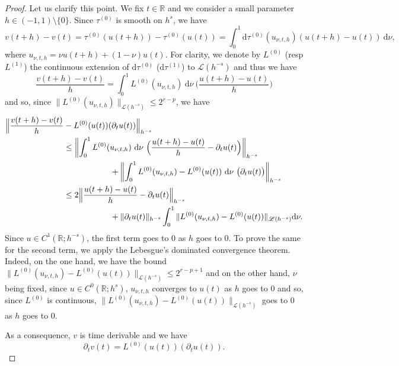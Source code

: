 \begin{proof}
Let us clarify this point. We fix $t\in \mathbb{R}$ and we consider a small parameter $h\in (-1,1)\setminus \{0\}$.
Since $\tau^{(0)}$ is smooth on $h^s$, we have\vspace*{-3pt}
\[
v(t+h)-v(t) = \tau^{(0)}(u(t+h)) - \tau^{(0)}(u(t)) = \int_0^1 \mathrm{d}\tau^{(0)}(u_{\nu,t,h})(u(t+h) - u(t)) \ \mathrm{d}\nu,
\]
where $u_{\nu,t,h} = \nu u(t+h) +(1-\nu) u(t)$. For clarity, we denote by $L^{(0)}$ (resp $L^{(1)}$) the continuous extension of $\mathrm{d}\tau^{(0)}$ (\resp $\mathrm{d}\tau^{(1)}$) to $\mathscr{L}(h^{-s})$ and thus we have\vspace*{-3pt}
\[
\frac{v(t+h)-v(t)}h = \int_0^1 L^{(0)}(u_{\nu,t,h}) \ \mathrm{d}\nu \ \Big(\frac{u(t+h) - u(t)}{h}\Big)
\]
and so, since $ \| L^{(0)}(u_{\nu,t,h}) \|_{\mathscr{L}(h^{-s})}\leq 2^{r-p}$, we have\vspace*{-3pt}
\begin{equation*}
\begin{split}
\Bigl\| \frac{v(t+h)-v(t)}h &- L^{(0)}(u(t))(\partial_t u(t)) \Bigl\|_{h^{-s}} \\
&\leq \biggl\| \int_0^1 L^{(0)}(u_{\nu,t,h}) \ \mathrm{d}\nu \ \Big(\frac{u(t+h) - u(t)}{h} -\partial_t u(t)\Big) \biggl\|_{h^{-s}} \\
&\hspace*{2cm}+ \biggl\| \int_0^1 L^{(0)}(u_{\nu,t,h}) - L^{(0)}(u(t)) \ \mathrm{d}\nu \ \big(\partial_t u(t)\big) \biggl\|_{h^{-s}} \\
&\leq 2 \Big\| \frac{u(t+h) - u(t)}{h} -\partial_t u(t)\Big \|_{h^{-s}} \\ &\hspace*{2cm}+ \| \partial_t u(t) \|_{h^{-s}} \int_0^1 \| L^{(0)}(u_{\nu,t,h}) - L^{(0)}(u(t)) \|_{\mathscr{L}(h^{-s})} \mathrm{d}\nu.
\end{split}
\end{equation*}
Since $u\in C^1(\mathbb{R};h^{-s})$, the first term goes to $0$ as $h$ goes to $0$. To prove the same for the second term, we apply the Lebesgue's dominated convergence theorem. Indeed, on the one hand, we have the bound $ \| L^{(0)}(u_{\nu,t,h}) - L^{(0)}(u(t)) \|_{\mathscr{L}(h^{-s})} \leq 2^{r-p+1}$ and on the other hand, $\nu$ being fixed, since $u\in C^0(\mathbb{R};h^{s})$, $u_{\nu,t,h}$ converges to $u(t)$ as $h$ goes to $0$ and so, since $L^{(0)}$ is continuous, $\| L^{(0)}(u_{\nu,t,h}) - L^{(0)}(u(t)) \|_{\mathscr{L}(h^{-s})}$ goes to $0$ as $h$ goes to $0$.

As a consequence, $v$ is time derivable and we have
\[
\partial_t v(t) = L^{(0)}(u(t))(\partial_t u(t)).
\]


\end{proof}
